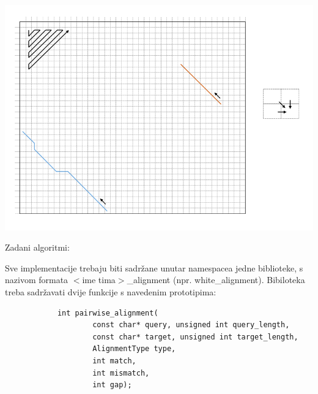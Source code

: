 \documentclass[times, 12pt, utf8]{article}
\begin{document}
            \includegraphics[width=\textwidth]{sample_alignment.png} 

            Zadani algoritmi:

            Sve implementacije trebaju biti sadržane unutar namespacea jedne biblioteke, 
            s nazivom formata \colorbox{gray!30}{$<$ime tima$>$\_alignment} 
            (npr. \colorbox{gray!30}{white\_alignment}). Bibiloteka
            treba sadržavati dvije funkcije s navedenim prototipima:

            \begin{lstlisting}
            int pairwise_alignment(
                    const char* query, unsigned int query_length,
                    const char* target, unsigned int target_length, 
                    AlignmentType type,
                    int match,
                    int mismatch,
                    int gap);
            \end{lstlisting}
\end{document}
